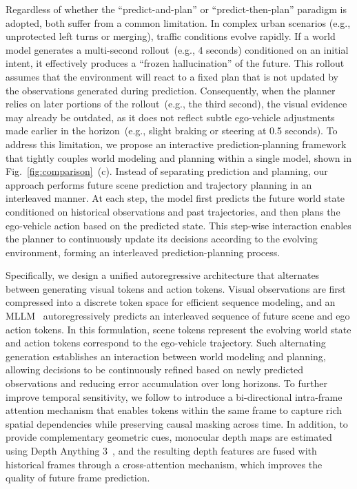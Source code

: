 \documentclass[runningheads]{llncs}
\begin{document}
Regardless of whether the ``predict-and-plan'' or ``predict-then-plan'' paradigm is adopted, both suffer from a common limitation. In complex urban scenarios (e.g., unprotected left turns or merging), traffic conditions evolve rapidly. If a world model generates a multi-second rollout~(e.g., 4 seconds) conditioned on an initial intent, it effectively produces a ``frozen hallucination'' of the future. This rollout assumes that the environment will react to a fixed plan that is not updated by the observations generated during prediction. Consequently, when the planner relies on later portions of the rollout~(e.g., the third second), the visual evidence may already be outdated, as it does not reflect subtle ego-vehicle adjustments made earlier in the horizon~(e.g., slight braking or steering at 0.5 seconds).
To address this limitation, we propose an interactive prediction-planning framework that tightly couples world modeling and planning within a single model, shown in Fig.~\ref{fig:comparison}~(c). Instead of separating prediction and planning, our approach performs future scene prediction and trajectory planning in an interleaved manner. At each step, the model first predicts the future world state conditioned on historical observations and past trajectories, and then plans the ego-vehicle action based on the predicted state. This step-wise interaction enables the planner to continuously update its decisions according to the evolving environment, forming an interleaved prediction-planning process.

Specifically, we design a unified autoregressive architecture that alternates between generating visual tokens and action tokens. Visual observations are first compressed into a discrete token space for efficient sequence modeling, and an MLLM~\cite{xie2024showo} autoregressively predicts an interleaved sequence of future scene and ego action tokens. In this formulation, scene tokens represent the evolving world state and action tokens correspond to the ego-vehicle trajectory. Such alternating generation establishes an interaction between world modeling and planning, allowing decisions to be continuously refined based on newly predicted observations and reducing error accumulation over long horizons. To further improve temporal sensitivity, we follow \cite{zhao2025pwm} to introduce a bi-directional intra-frame attention mechanism that enables tokens within the same frame to capture rich spatial dependencies while preserving causal masking across time. In addition, to provide complementary geometric cues, monocular depth maps are estimated using Depth Anything 3~\cite{lin2025depth3recoveringvisual}, and the resulting depth features are fused with historical frames through a cross-attention mechanism, which improves the quality of future frame prediction.
\end{document}
